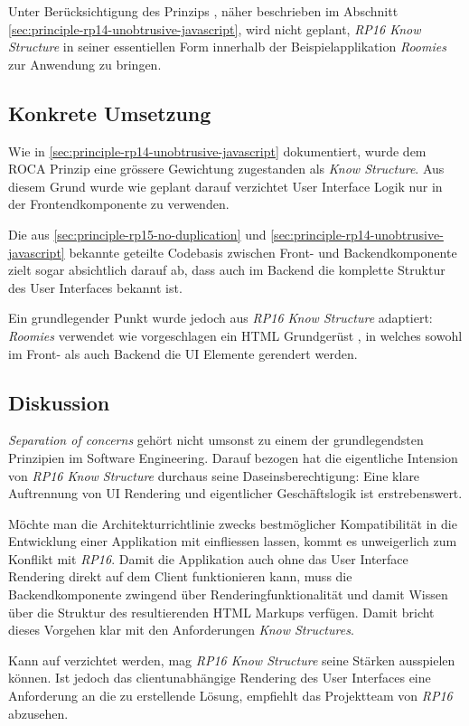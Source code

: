 Unter Berücksichtigung des Prinzips \emph{}, näher beschrieben im Abschnitt \ref{sec:principle-rp14-unobtrusive-javascript}, wird nicht geplant, \emph{RP16 Know Structure} in seiner essentiellen Form innerhalb der Beispielapplikation \emph{Roomies} zur Anwendung zu bringen.


\subsection*{Konkrete Umsetzung}

Wie in \ref{sec:principle-rp14-unobtrusive-javascript} dokumentiert, wurde dem ROCA Prinzip \emph{} eine grössere Gewichtung zugestanden als \emph{Know Structure}. Aus diesem Grund wurde wie geplant darauf verzichtet User Interface Logik nur in der Frontendkomponente zu verwenden.

Die aus \ref{sec:principle-rp15-no-duplication} und \ref{sec:principle-rp14-unobtrusive-javascript} bekannte geteilte Codebasis zwischen Front- und Backendkomponente zielt sogar absichtlich darauf ab, dass auch im Backend die komplette Struktur des User Interfaces bekannt ist.

Ein grundlegender Punkt wurde jedoch aus \emph{RP16 Know Structure} adaptiert: \emph{Roomies} verwendet wie vorgeschlagen ein HTML Grundgerüst \cite{roomiesHtmlSkeleton}, in welches sowohl im Front- als auch Backend die UI Elemente gerendert werden.


\subsection*{Diskussion}

\emph{Separation of concerns} \cite{SeparationOfConcerns} gehört nicht umsonst zu einem der grundlegendsten Prinzipien im Software Engineering. Darauf bezogen hat die eigentliche Intension von \emph{RP16 Know Structure} durchaus seine Daseinsberechtigung: Eine klare Auftrennung von UI Rendering und eigentlicher Geschäftslogik ist erstrebenswert.

Möchte man die Architekturrichtlinie \emph{} zwecks bestmöglicher Kompatibilität in die Entwicklung einer Applikation mit einfliessen lassen, kommt es unweigerlich zum Konflikt mit \emph{RP16}. Damit die Applikation auch ohne das User Interface Rendering direkt auf dem Client funktionieren kann, muss die Backendkomponente zwingend über Renderingfunktionalität und damit Wissen über die Struktur des resultierenden HTML Markups verfügen. Damit bricht dieses Vorgehen klar mit den Anforderungen \emph{Know Structures}.

Kann auf \emph{} verzichtet werden, mag \emph{RP16 Know Structure} seine Stärken ausspielen können. Ist jedoch das clientunabhängige Rendering des User Interfaces eine Anforderung an die zu erstellende Lösung, empfiehlt das Projektteam von \emph{RP16} abzusehen.
